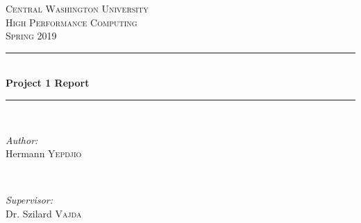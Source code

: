 \documentclass[12pt]{article}
\begin{document}
	
	\begin{titlepage}
		
		\newcommand{\HRule}{\rule{\linewidth}{0.5mm}} %
		
		\center %
		
		
		\textsc{\LARGE Central Washington University}\\[1.5cm] %
		\textsc{\Large High Performance Computing}\\[0.5cm] %
		\textsc{\large Spring 2019}\\[0.5cm] %
		
		
		\HRule \\[0.4cm]
		{ \huge \bfseries Project 1 Report}\\[0.4cm] %
		\HRule \\[1.5cm]
		
		
		\begin{minipage}{0.4\textwidth}
			\begin{flushleft} \large
				\emph{Author:}\\
				Hermann \textsc{Yepdjio} %
			\end{flushleft}
		\end{minipage}
		~
		\begin{minipage}{0.4\textwidth}
			\begin{flushright} \large
				\emph{Supervisor:} \\
				Dr. Szilard \textsc{Vajda} %
			\end{flushright}
		\end{minipage}\\[1cm]
		

\end{titlepage}
\end{document}
